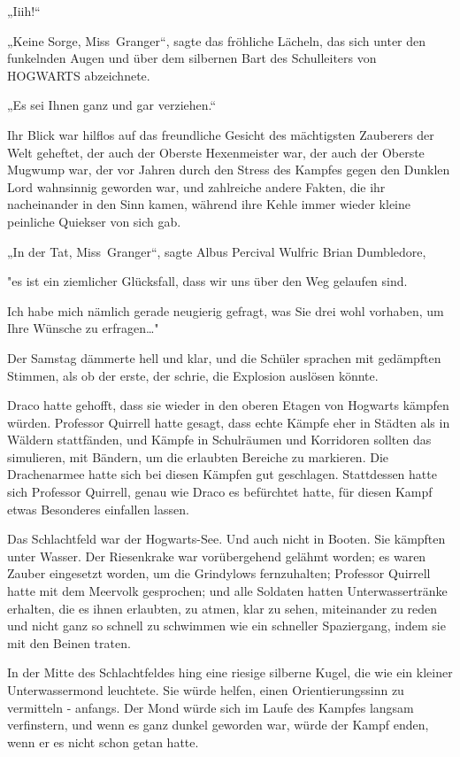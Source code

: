 {„Iiih!“

„Keine Sorge, Miss~Granger“, sagte das fröhliche Lächeln, das sich unter den funkelnden Augen und über dem silbernen Bart des Schulleiters von HOGWARTS abzeichnete.

„Es sei Ihnen ganz und gar verziehen.“

Ihr Blick war hilflos auf das freundliche Gesicht des mächtigsten Zauberers der Welt geheftet, der auch der Oberste Hexenmeister war, der auch der Oberste Mugwump war, der vor Jahren durch den Stress des Kampfes gegen den Dunklen Lord wahnsinnig geworden war, und zahlreiche andere Fakten, die ihr nacheinander in den Sinn kamen, während ihre Kehle immer wieder kleine peinliche Quiekser von sich gab.

„In der Tat, Miss~Granger“, sagte Albus Percival Wulfric Brian Dumbledore,

"es ist ein ziemlicher Glücksfall, dass wir uns über den Weg gelaufen sind.

Ich habe mich nämlich gerade neugierig gefragt, was Sie drei wohl vorhaben, um Ihre Wünsche zu erfragen…"

Der Samstag dämmerte hell und klar, und die Schüler sprachen mit gedämpften Stimmen, als ob der erste, der schrie, die Explosion auslösen könnte.

Draco hatte gehofft, dass sie wieder in den oberen Etagen von Hogwarts kämpfen würden. Professor Quirrell hatte gesagt, dass echte Kämpfe eher in Städten als in Wäldern stattfänden, und Kämpfe in Schulräumen und Korridoren sollten das simulieren, mit Bändern, um die erlaubten Bereiche zu markieren. Die Drachenarmee hatte sich bei diesen Kämpfen gut geschlagen. Stattdessen hatte sich Professor Quirrell, genau wie Draco es befürchtet hatte, für diesen Kampf etwas Besonderes einfallen lassen.

Das Schlachtfeld war der Hogwarts-See. Und auch nicht in Booten. Sie kämpften unter Wasser. Der Riesenkrake war vorübergehend gelähmt worden; es waren Zauber eingesetzt worden, um die Grindylows fernzuhalten; Professor Quirrell hatte mit dem Meervolk gesprochen; und alle Soldaten hatten Unterwassertränke erhalten, die es ihnen erlaubten, zu atmen, klar zu sehen, miteinander zu reden und nicht ganz so schnell zu schwimmen wie ein schneller Spaziergang, indem sie mit den Beinen traten.

In der Mitte des Schlachtfeldes hing eine riesige silberne Kugel, die wie ein kleiner Unterwassermond leuchtete. Sie würde helfen, einen Orientierungssinn zu vermitteln - anfangs. Der Mond würde sich im Laufe des Kampfes langsam verfinstern, und wenn es ganz dunkel geworden war, würde der Kampf enden, wenn er es nicht schon getan hatte.

}

